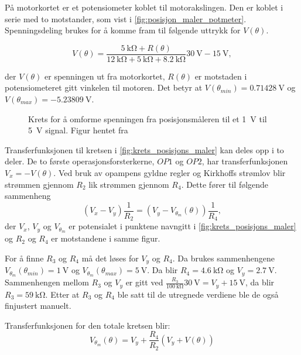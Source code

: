 På motorkortet er et potensiometer koblet til motorakslingen. Den er koblet i serie med to motstander, som vist i \autoref{fig:posisjon_maler_potmeter}. Spenningsdeling brukes for å komme fram til følgende uttrykk for $V(\theta)$.

\begin{equation}
    \label{eq:V_av_theta}
    V(\theta) = \frac{\SI{5}{\kilo\ohm} + R(\theta)}{\SI{12}{\kilo\ohm} + \SI{5}{\kilo\ohm} + \SI{8.2}{\kilo\ohm}} \SI{30}{\volt} - \SI{15}{\volt},
\end{equation}

der $V(\theta)$ er spenningen ut fra motorkortet, $R(\theta)$ er motstaden i potensiometeret gitt vinkelen til motoren. Det betyr at $V(\theta_{min}) = \SI{0.71428}{\volt}$ og $V(\theta_{max}) =\SI{-5.23809}{\volt}$. 

\begin{figure}[h]
    \centering
    
    \caption{Krets for å omforme spenningen fra posisjonsmåleren til et \SI{1}{\volt} til \SI{5}{\volt} signal. Figur hentet fra \cite{AnalogMotorlabbOppgaver}}
    \label{fig:krets_posisjons_maler}
\end{figure}

Transferfunksjonen til kretsen i \autoref{fig:krets_posisjons_maler} kan deles opp i to deler. De to første operasjonsforsterkerne, $OP1$ og $OP2$, har transferfunksjonen $V_x = -V(\theta)$. Ved bruk av opampens gyldne regler og Kirkhoffs strømlov blir strømmen gjennom $R_2$ lik strømmen gjennom $R_4$. Dette fører til følgende sammenheng
\begin{equation}
    \label{eq:posisjonmåler_skalering}
    (V_x - V_y) \frac{1}{R_2} = (V_y - V_{\theta_m}(\theta)) \frac{1}{R_4},
\end{equation}
der $V_x$, $V_y$ og $V_{\theta_m}$ er potensialet i punktene navngitt i \autoref{fig:krets_posisjons_maler} og $R_2$ og $R_4$ er motstandene i samme figur.

For å finne $R_3$ og $R_4$ må det løses for $V_y$ og $R_4$. Da brukes sammenhengene $V_{\theta_m}(\theta_{min}) = \SI{1}{\volt}$ og $V_{\theta_m}(\theta_{max}) = \SI{5}{\volt}$. Da blir $R_4 = \SI{4.6}{\kilo\ohm}$ og 
$V_y = \SI{2.7}{\volt}$. Sammenhengen mellom $R_3$ og $V_y$ er gitt ved $\frac{R_3}{\SI{100}{\kilo\ohm}} \SI{30}{\volt} = V_y + \SI{15}{\volt}$, da blir $R_3 = \SI{59}{\kilo\ohm}$. Etter at $R_3$ og $R_4$ ble satt til de utregnede verdiene ble de også finjustert manuelt.

Transferfunksjonen for den totale kretsen blir:
\begin{equation}
    \label{eq:posisjon_maling_transferfuksjon}
    V_{\theta_m}(\theta) = V_y + \frac{R_4}{R_2}(V_y + V(\theta))
\end{equation}







